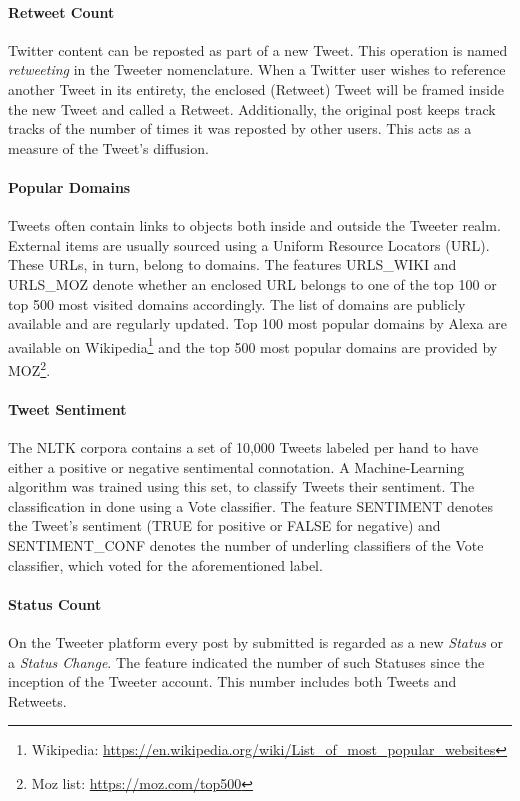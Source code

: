 		\paragraph{Retweet Count}
			Twitter content can be reposted as part of a new Tweet. This operation is named \textit{retweeting} in the Tweeter nomenclature. When a Twitter user wishes to reference another Tweet in its entirety, the enclosed (Retweet) Tweet will be framed inside the new Tweet and called a Retweet. Additionally, the original post keeps track tracks of the number of times it was reposted by other users. This acts as a measure of the Tweet's diffusion.
		
		\paragraph{Popular Domains}
			Tweets often contain links to objects both inside and outside the Tweeter realm. External items are usually sourced using a Uniform Resource Locators (URL). These URLs, in turn, belong to domains. The features URLS\_WIKI and URLS\_MOZ denote whether an enclosed URL belongs to one of the top 100 or top 500 most visited domains accordingly. The list of domains are publicly available and are regularly updated. Top 100 most popular domains by Alexa are available on Wikipedia\footnote{\hspace{0.01cm} Wikipedia: \url{https://en.wikipedia.org/wiki/List_of_most_popular_websites}} and the top 500 most popular domains are provided by MOZ\footnote{\hspace{0.01cm} Moz list: \url{https://moz.com/top500}}.
		
		\paragraph{Tweet Sentiment}
			The NLTK corpora contains a set of 10,000 Tweets labeled per hand to have either a positive or negative sentimental connotation. A Machine-Learning algorithm was trained using this set, to classify Tweets their sentiment. The classification in done using a Vote classifier. The feature SENTIMENT denotes the Tweet's sentiment (TRUE for positive or FALSE for negative) and SENTIMENT\_CONF denotes the number of underling classifiers of the Vote classifier, which voted for the aforementioned label.
		
		\paragraph{Status Count}
			On the Tweeter platform every post by submitted is regarded as a new \textit{Status} or a \textit{Status Change}. The feature indicated the number of such Statuses since the inception of the Tweeter account. This number includes both Tweets and Retweets.
		
